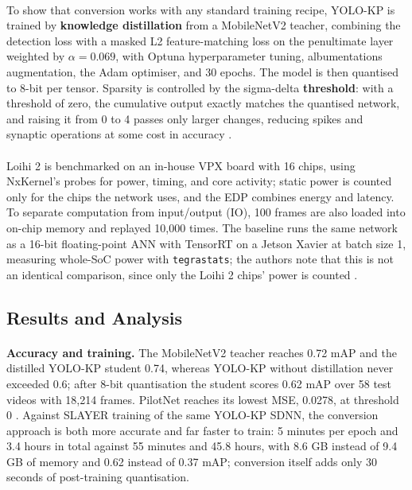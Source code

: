 \documentclass[12pt,a4paper,final]{extreport}
\begin{document}
\paragraph{} To show that conversion works with any standard training recipe, YOLO-KP is trained by \textbf{knowledge distillation} from a MobileNetV2 teacher, combining the detection loss with a masked L2 feature-matching loss on the penultimate layer weighted by $\alpha=0.069$, with Optuna hyperparameter tuning, albumentations augmentation, the Adam optimiser, and 30 epochs. The model is then quantised to 8-bit per tensor. Sparsity is controlled by the sigma-delta \textbf{threshold}: with a threshold of zero, the cumulative output exactly matches the quantised network, and raising it from 0 to 4 passes only larger changes, reducing spikes and synaptic operations at some cost in accuracy \cite{p4}.

\paragraph{} Loihi 2 is benchmarked on an in-house VPX board with 16 chips, using NxKernel's probes for power, timing, and core activity; static power is counted only for the chips the network uses, and the EDP combines energy and latency. To separate computation from input/output (IO), 100 frames are also loaded into on-chip memory and replayed 10{,}000 times. The baseline runs the same network as a 16-bit floating-point ANN with TensorRT on a Jetson Xavier at batch size 1, measuring whole-SoC power with \texttt{tegrastats}; the authors note that this is not an identical comparison, since only the Loihi 2 chips' power is counted \cite{p4}.

\subsection{Results and Analysis}

\paragraph{} \textbf{Accuracy and training.} The MobileNetV2 teacher reaches 0.72 mAP and the distilled YOLO-KP student 0.74, whereas YOLO-KP without distillation never exceeded 0.6; after 8-bit quantisation the student scores 0.62 mAP over 58 test videos with 18{,}214 frames. PilotNet reaches its lowest MSE, 0.0278, at threshold 0 \cite{p4}. Against SLAYER training of the same YOLO-KP SDNN, the conversion approach is both more accurate and far faster to train: 5 minutes per epoch and 3.4 hours in total against 55 minutes and 45.8 hours, with 8.6 GB instead of 9.4 GB of memory and 0.62 instead of 0.37 mAP; conversion itself adds only 30 seconds of post-training quantisation.
\end{document}
